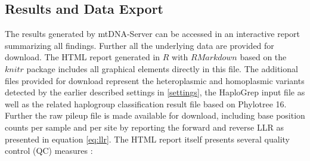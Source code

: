 \subsection{Results and Data Export}
The results generated by mtDNA-Server can be accessed in an interactive report summarizing all findings. Further all the underlying data are provided for download. The HTML report generated in $R$ with $RMarkdown$ based on the $knitr$ package includes all graphical elements directly in this file. The additional files provided for download represent the  heteroplasmic and homoplasmic variants detected by the earlier described settings in \ref{settings}, the HaploGrep input file as well as the related haplogroup classification result file based on Phylotree 16. Further the raw pileup file is made available for download, including base position counts per sample and per site by reporting the forward and reverse LLR as presented in equation \ref{eq:llr}. 
The HTML report itself presents several quality control (QC) measures  \cite{Weissensteiner2016b}: 
